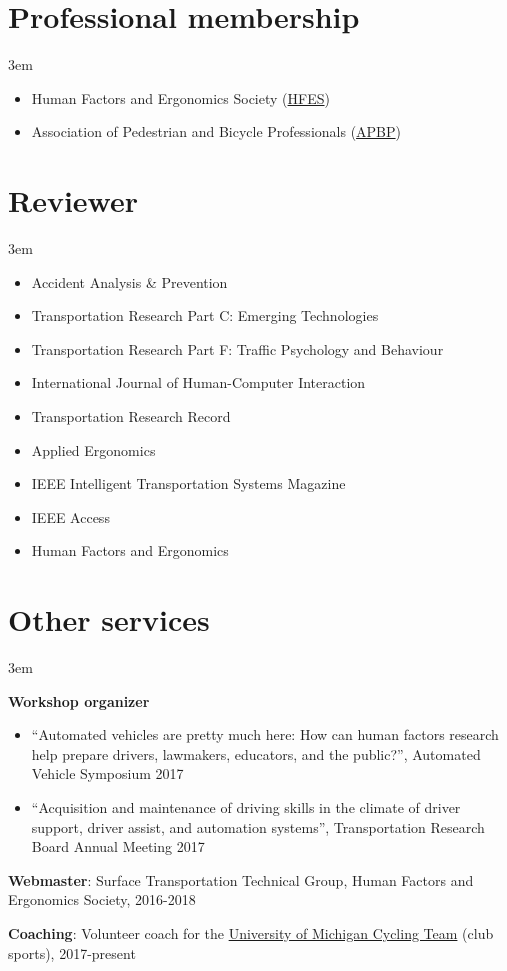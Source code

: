 \documentclass[11pt]{article}
\newenvironment{main}
{\begin{adjustwidth}{3em}{}}
{\end{adjustwidth}}
\begin{document}
\section*{Professional membership}
\begin{main}

\begin{itemize}
    \item Human Factors and Ergonomics Society (\href{https://www.hfes.org/}{HFES})
    \item Association of Pedestrian and Bicycle Professionals (\href{https://www.apbp.org/}{APBP})
\end{itemize}


\end{main}
\section*{Reviewer}
\begin{main}

\begin{itemize}
    \item Accident Analysis \& Prevention
    \item Transportation Research Part C: Emerging Technologies
    \item Transportation Research Part F: Traffic Psychology and Behaviour
    \item International Journal of Human-Computer Interaction
    \item Transportation Research Record
    \item Applied Ergonomics
    \item IEEE Intelligent Transportation Systems Magazine
    \item IEEE Access
    \item Human Factors and Ergonomics
\end{itemize}


\end{main}
\section*{Other services}
\begin{main}

\textbf{Workshop organizer}
\begin{itemize}
    \item “Automated vehicles are pretty much here: How can human factors research help prepare drivers, lawmakers, educators, and the public?”, Automated Vehicle Symposium 2017
    \item “Acquisition and maintenance of driving skills in the climate of driver support, driver assist, and automation systems”, Transportation Research Board Annual Meeting 2017
\end{itemize}

\textbf{Webmaster}: Surface Transportation Technical Group, Human Factors and Ergonomics Society, 2016-2018

\textbf{Coaching}: Volunteer coach for the \href{https://www.umcycling.org/}{University of Michigan Cycling Team} (club sports), 2017-present

\end{main}
\end{document}
